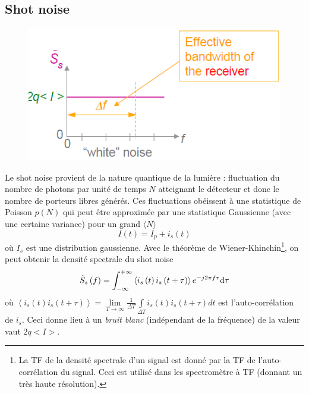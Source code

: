 \subsection{Shot noise}
\begin{figure}
\vspace{-8mm}
\includegraphics[scale=0.5]{ch5/image13}
\end{figure}
Le shot noise provient de la nature quantique de la lumière : fluctuation du nombre de photons
par unité de temps $N$ atteignant le détecteur et donc le nombre de porteurs libres générés. Ces
fluctuations obéissent à une statistique de Poisson $p(N)$ qui peut être approximée par une 
statistique Gaussienne (avec une certaine variance) pour un grand $\langle N\rangle$
\begin{equation}
I\left( t \right) = {I_p} + {i_s}\left( t \right)
\end{equation}
où $I_s$ est une distribution gaussienne. Avec le théorème de Wiener-Khinchin\footnote{La TF de 
la densité spectrale d'un signal est donné par la TF de l'auto-corrélation du signal. Ceci est 
utilisé dans les spectromètre à TF (donnant un très haute résolution).}, on peut obtenir
la densité spectrale du shot noise
\begin{equation}
{\tilde S_s}\left( f \right) = \int_{ - \infty }^{ + \infty } {\left\langle {{i_s}\left( t \right){i_s}\left( {t + \tau } \right)} \right\rangle {e^{ - j2\pi f\tau }}{\rm{d}}\tau } 
\end{equation}
où $\left\langle {{i_s}\left( t \right){i_s}\left( {t + \tau } \right)} \right\rangle  = \mathop {\lim }\limits_{T \to \infty } \frac{1}{{\Delta T}}\int\limits_{\Delta T} {{i_s}\left( t \right){i_s}\left( {t + \tau } \right)dt}$ est l'auto-corrélation de $i_s$. Ceci donne lieu à un \textit{bruit blanc} 
(indépendant de la fréquence) de la valeur vaut $2q<I>$.\\

